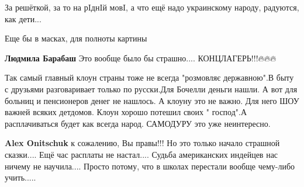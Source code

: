 \begin{itemize}
За решёткой, за то на рIднIй мовI, а что ещё надо украинскому народу, радуются, как дети...

 
Еще бы в масках, для полноты картины

\begin{itemize}
 
\textbf{Людмила Барабаш} Это вообще было бы страшно....
КОНЦЛАГЕРЬ!!!🔥🔥🔥
\end{itemize}

 

Так самый главный клоун страны тоже не всегда "розмовляє державною".В быту с
друзьями разговаривает только по русски.Для Бочелли деньги нашли. А вот для
больниц и пенсионеров денег не нашлось. А клоуну это не важно. Для него ШОУ
важней всяких детдомов. Клоун хорошо потешил своих " господ".А расплачиваться
будет как всегда народ. САМОДУРУ это уже неинтересно.

\begin{itemize}
 
\textbf{Alex Onitschuk} к сожалению, Вы правы!!!
Но это только начало страшной сказки....
Ещё час расплаты не настал....
Судьба американских индейцев нас ничему не научила....
Просто потому, что в школах перестали вообще чему-либо учить.....

 

\end{itemize}
\end{itemize}
